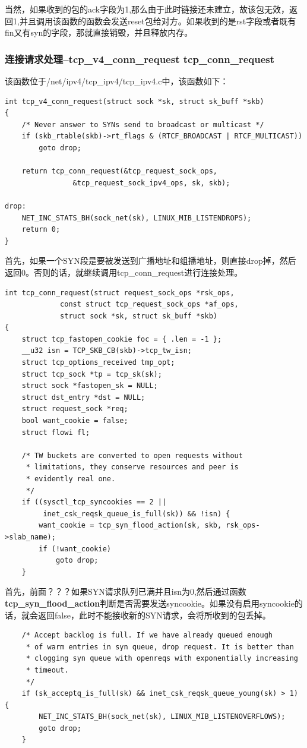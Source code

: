 \documentclass[11pt, a4paper,oneside]{book}
\theoremstyle{ocrenumbox}
\theoremstyle{purplenumbox}
\theoremstyle{blackbox}
\begin{document}
                当然，如果收到的包的ack字段为1,那么由于此时链接还未建立，故该包无效，返回1,并且调用该函数的函数会发送reset包给对方。如果收到的是rst字段或者既有fin又有syn的字段，那就直接销毁，并且释放内存。
            \subsubsection{连接请求处理--tcp\_v4\_conn\_request  tcp\_conn\_request}
                该函数位于/net/ipv4/tcp\_ipv4/tcp\_ipv4.c中，该函数如下：
\begin{verbatim}
int tcp_v4_conn_request(struct sock *sk, struct sk_buff *skb)
{
    /* Never answer to SYNs send to broadcast or multicast */
    if (skb_rtable(skb)->rt_flags & (RTCF_BROADCAST | RTCF_MULTICAST))
        goto drop;

    return tcp_conn_request(&tcp_request_sock_ops,
                &tcp_request_sock_ipv4_ops, sk, skb);

drop:
    NET_INC_STATS_BH(sock_net(sk), LINUX_MIB_LISTENDROPS);
    return 0;
}
\end{verbatim}
                
		首先，如果一个SYN段是要被发送到广播地址和组播地址，则直接drop掉，然后返回0。否则的话，就继续调用tcp\_conn\_request进行连接处理。
\begin{verbatim}
int tcp_conn_request(struct request_sock_ops *rsk_ops,
             const struct tcp_request_sock_ops *af_ops,
             struct sock *sk, struct sk_buff *skb)
{
    struct tcp_fastopen_cookie foc = { .len = -1 };
    __u32 isn = TCP_SKB_CB(skb)->tcp_tw_isn;
    struct tcp_options_received tmp_opt;
    struct tcp_sock *tp = tcp_sk(sk);
    struct sock *fastopen_sk = NULL;
    struct dst_entry *dst = NULL;
    struct request_sock *req;
    bool want_cookie = false;
    struct flowi fl;

    /* TW buckets are converted to open requests without
     * limitations, they conserve resources and peer is
     * evidently real one.
     */
    if ((sysctl_tcp_syncookies == 2 ||
         inet_csk_reqsk_queue_is_full(sk)) && !isn) {
        want_cookie = tcp_syn_flood_action(sk, skb, rsk_ops->slab_name);
        if (!want_cookie)
            goto drop;
    }
\end{verbatim}
                首先，前面？？？如果SYN请求队列已满并且isn为0,然后通过函数\textbf{tcp\_syn\_flood\_action}判断是否需要发送syncookie。如果没有启用syncookie的话，就会返回false，此时不能接收新的SYN请求，会将所收到的包丢掉。
\begin{verbatim}
	/* Accept backlog is full. If we have already queued enough
	 * of warm entries in syn queue, drop request. It is better than
	 * clogging syn queue with openreqs with exponentially increasing
	 * timeout.
	 */
	if (sk_acceptq_is_full(sk) && inet_csk_reqsk_queue_young(sk) > 1) {
		NET_INC_STATS_BH(sock_net(sk), LINUX_MIB_LISTENOVERFLOWS);
		goto drop;
	}
\end{verbatim}
\end{document}
